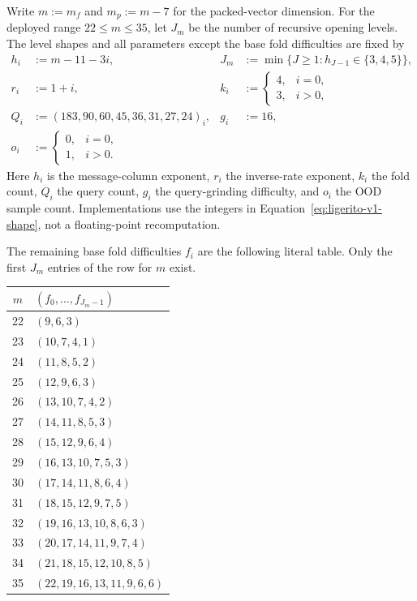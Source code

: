 Write $m:=m_f$ and $m_p:=m-7$ for the packed-vector dimension.  For the deployed
range $22\le m\le35$, let $J_m$ be the number of recursive
opening levels.  The level shapes and all parameters except the base fold
difficulties are fixed by
\begin{equation}
 \begin{aligned}
  h_i&:=m-11-3i,&
  J_m&:=\min\{J\ge1:h_{J-1}\in\{3,4,5\}\},\\
  r_i&:=1+i,&
  k_i&:=\begin{cases}4,&i=0,\\3,&i>0,\end{cases}\\
  Q_i&:=(183,90,60,45,36,31,27,24)_i,&
  g_i&:=16,\\
  o_i&:=\begin{cases}0,&i=0,\\1,&i>0.\end{cases}
 \end{aligned}
 \label{eq:ligerito-v1-shape}
\end{equation}
Here $h_i$ is the message-column exponent, $r_i$ the inverse-rate exponent,
$k_i$ the fold count, $Q_i$ the query count, $g_i$ the query-grinding
difficulty, and $o_i$ the OOD sample count.  Implementations \must{} use the
integers in Equation~\eqref{eq:ligerito-v1-shape}, not a floating-point
recomputation.

The remaining base fold difficulties $f_i$ are the following literal table.
Only the first $J_m$ entries of the row for $m$ exist.

\begingroup\footnotesize
\renewcommand{\arraystretch}{1.02}
\begin{longtable}{@{}c@{\quad}l@{}}
\toprule
$m$&$(f_0,\ldots,f_{J_m-1})$\\
\midrule
22&$(9,6,3)$\\
23&$(10,7,4,1)$\\
24&$(11,8,5,2)$\\
25&$(12,9,6,3)$\\
26&$(13,10,7,4,2)$\\
27&$(14,11,8,5,3)$\\
28&$(15,12,9,6,4)$\\
29&$(16,13,10,7,5,3)$\\
30&$(17,14,11,8,6,4)$\\
31&$(18,15,12,9,7,5)$\\
32&$(19,16,13,10,8,6,3)$\\
33&$(20,17,14,11,9,7,4)$\\
34&$(21,18,15,12,10,8,5)$\\
35&$(22,19,16,13,11,9,6,6)$\\
\bottomrule
\end{longtable}
\endgroup

